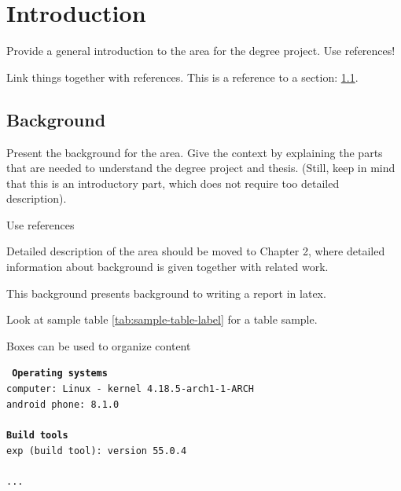 \section{Introduction}

Provide a general introduction to the area for the degree project. Use references!

Link things together with references. This is a reference to a section: \ref{sec:background}.

\subsection{Background}
\label{sec:background}
Present the background for the area. Give the context by explaining the parts that are needed to understand the degree project and thesis. (Still, keep in mind that this is an introductory part, which does not require too detailed description).

Use references

Detailed description of the area should be moved to Chapter 2, where detailed information about background is given together with related work. 

This background presents background to writing a report in latex.

Look at sample table \ref{tab:sample-table-label} for a table sample.



Boxes can be used to organize content

\begin{tcolorbox}[title={Development environment for prototype}]
	\tt{
		\textbf{Operating systems }\\
		computer: Linux - kernel 4.18.5-arch1-1-ARCH\\
		android phone: 8.1.0\\
		~\\
		\textbf{Build tools}\\
		exp (build tool): version 55.0.4\\
		~\\
		...
	}
\end{tcolorbox}


